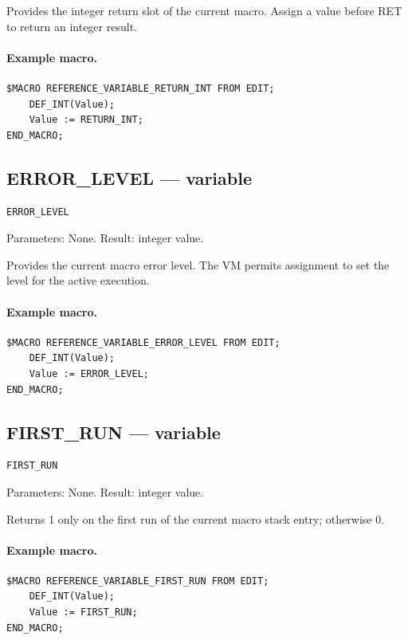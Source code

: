\documentclass[a4paper,10pt,twoside,openany]{book}
\begin{document}
Provides the integer return slot of the current macro. Assign a value before RET to return an integer result.

\paragraph{Example macro.}
\begin{verbatim}
$MACRO REFERENCE_VARIABLE_RETURN_INT FROM EDIT;
    DEF_INT(Value);
    Value := RETURN_INT;
END_MACRO;
\end{verbatim}

\label{prim:variable-error-level}
\subsection*{ERROR\_LEVEL --- variable}
\begin{verbatim}
ERROR_LEVEL
\end{verbatim}
Parameters: None. Result: integer value.

Provides the current macro error level. The VM permits assignment to set the level for the active execution.

\paragraph{Example macro.}
\begin{verbatim}
$MACRO REFERENCE_VARIABLE_ERROR_LEVEL FROM EDIT;
    DEF_INT(Value);
    Value := ERROR_LEVEL;
END_MACRO;
\end{verbatim}

\label{prim:variable-first-run}
\subsection*{FIRST\_RUN --- variable}
\begin{verbatim}
FIRST_RUN
\end{verbatim}
Parameters: None. Result: integer value.

Returns 1 only on the first run of the current macro stack entry; otherwise 0.

\paragraph{Example macro.}
\begin{verbatim}
$MACRO REFERENCE_VARIABLE_FIRST_RUN FROM EDIT;
    DEF_INT(Value);
    Value := FIRST_RUN;
END_MACRO;
\end{verbatim}
\end{document}
